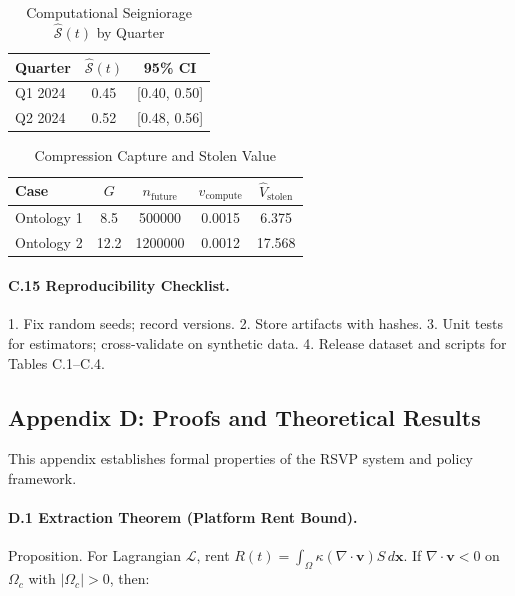 \documentclass[12pt]{article}
\begin{document}
\begin{table}[h]
\caption{Computational Seigniorage \(\widehat{\mathcal{S}}(t)\) by Quarter}
\centering
\begin{tabular}{lcc}
\toprule
Quarter & \(\widehat{\mathcal{S}}(t)\) & 95\% CI \\
\midrule
Q1 2024 & 0.45 & [0.40, 0.50] \\
Q2 2024 & 0.52 & [0.48, 0.56] \\
\bottomrule
\end{tabular}
\end{table}

\begin{table}[h]
\caption{Compression Capture and Stolen Value}
\centering
\begin{tabular}{lcccc}
\toprule
Case & \(G\) & \(n_{\text{future}}\) & \(v_{\text{compute}}\) & \(\widehat{V}_{\text{stolen}}\) \\
\midrule
Ontology 1 & 8.5 & 500000 & 0.0015 & 6.375 \\
Ontology 2 & 12.2 & 1200000 & 0.0012 & 17.568 \\
\bottomrule
\end{tabular}
\end{table}

\paragraph{C.15 Reproducibility Checklist.}

1. Fix random seeds; record versions.
2. Store artifacts with hashes.
3. Unit tests for estimators; cross-validate on synthetic data.
4. Release dataset and scripts for Tables C.1–C.4.

\subsection*{Appendix D: Proofs and Theoretical Results}

This appendix establishes formal properties of the RSVP system and policy framework.

\paragraph{D.1 Extraction Theorem (Platform Rent Bound).}

Proposition. For Lagrangian \(\mathcal{L}\), rent \( R(t) = \int_\Omega \kappa (\nabla \cdot \mathbf{v}) S \, d\mathbf{x} \). If \(\nabla \cdot \mathbf{v} < 0\) on \(\Omega_c\) with \( |\Omega_c| > 0 \), then:
\end{document}
